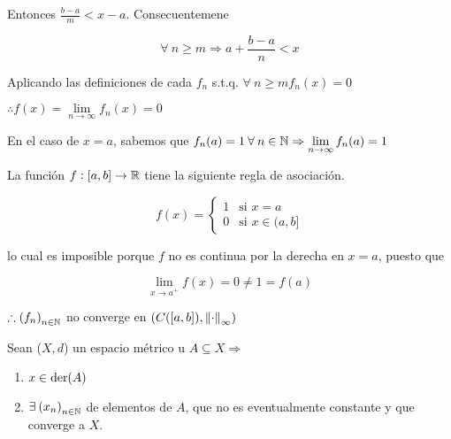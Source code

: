 \begin{proofexplanation}
\begin{enumerate}
        Entonces $\frac{b-a}{m} < x-a$. Consecuentemene 

        $$\forall \: n \geqslant m \Rightarrow a+\frac{b-a}{n} < x$$

        Aplicando las definiciones de cada $f_n$ s.t.q. $\forall \: n \geqslant m f_n(x) = 0$

        $\therefore f(x) = \lim\limits_{n \to \infty} f_n(x) = 0$

        En el caso de $x=a$, sabemos que $f_n(a) = 1 \: \forall \: n \in \N \Rightarrow  \lim\limits_{n \to \infty} f_n(a) = 1$

        La función $f : [a,b] \to \mathbb{R}$ tiene la siguiente regla de asociación.

        $$ f(x) = \begin{cases}
              1 & \text{si }  x = a\\
              0 & \text{si } x \in (a,b]
     \end{cases}$$

     lo cual es imposible porque $f$ no es continua por la derecha en $x = a$, puesto que 

     $$ \lim\limits_{x \to a^+} f(x) = 0 \neq 1 = f(a)$$

     $\therefore {(f_n)}_{n \in \mathbb{N}}$ no converge en $(C([a,b]), \norm{\cdot}_\infty)$
    \end{enumerate}
\end{proofexplanation}

\begin{theorem} \label{theom2214}
    Sean ($X,d$) un espacio métrico u $A \subseteq X \Rightarrow$ 
\begin{enumerate}
    \item $x \in \mathrm{der}(A) $
    \item $\exists \: {(x_n)}_{n \in \mathbb{N}}$ de elementos de $A$,  que no es eventualmente constante y que converge a $X$.
    \end{enumerate}
\end{theorem}

